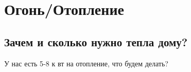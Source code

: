 \part{Огонь/Отопление}
\chapter{Зачем и сколько нужно тепла дому?}
У нас есть 5-8 к	вт на отопление, что будем делать?
